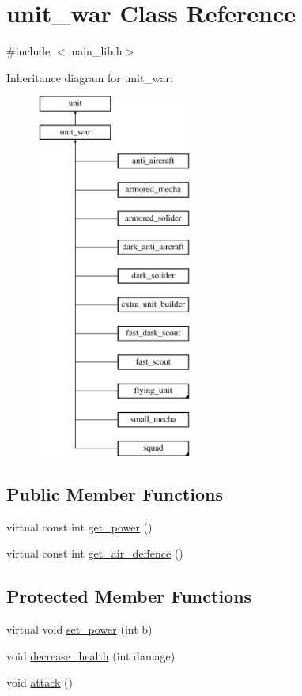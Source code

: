 \hypertarget{classunit__war}{}\section{unit\+\_\+war Class Reference}
\label{classunit__war}


{\ttfamily \#include $<$main\+\_\+lib.\+h$>$}

Inheritance diagram for unit\+\_\+war\+:\begin{figure}[H]
\begin{center}
\leavevmode
\includegraphics[height=12.000000cm]{classunit__war}
\end{center}
\end{figure}
\subsection*{Public Member Functions}
\begin{DoxyCompactItemize}
\item 
virtual const int \mbox{\hyperlink{classunit__war_adea1fced490739cf8b7a6e49ec90cf59}{get\+\_\+power}} ()
\item 
virtual const int \mbox{\hyperlink{classunit__war_af26f2da420a828230a329339bc9ef805}{get\+\_\+air\+\_\+deffence}} ()
\end{DoxyCompactItemize}
\subsection*{Protected Member Functions}
\begin{DoxyCompactItemize}
\item 
virtual void \mbox{\hyperlink{classunit__war_a8ea09eb3e352d5a3b2d7611ac78124a2}{set\+\_\+power}} (int b)
\item 
void \mbox{\hyperlink{classunit__war_ae171887cd752f92cee8cc4e32c541684}{decrease\+\_\+health}} (int damage)
\item 
void \mbox{\hyperlink{classunit__war_a9f1ae061c0761d35bdaaac8098d69dd0}{attack}} ()
\end{DoxyCompactItemize}
